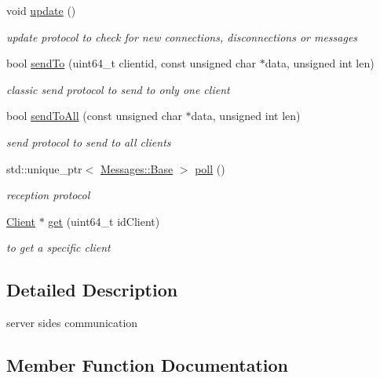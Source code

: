 \begin{DoxyCompactItemize}
void \hyperlink{class_network_1_1_t_c_p_1_1_server_a6a8fdc8571bbbd999c7c2767fc5b34bf}{update} ()
\begin{DoxyCompactList}\small\item\em update protocol to check for new connections, disconnections or messages \end{DoxyCompactList}\item 
bool \hyperlink{class_network_1_1_t_c_p_1_1_server_af7896a328c27db52fd99e0c5888754f1}{send\+To} (uint64\+\_\+t clientid, const unsigned char $\ast$data, unsigned int len)
\begin{DoxyCompactList}\small\item\em classic send protocol to send to only one client \end{DoxyCompactList}\item 
bool \hyperlink{class_network_1_1_t_c_p_1_1_server_af017b5f9caa9147cf4502750ccc3639a}{send\+To\+All} (const unsigned char $\ast$data, unsigned int len)
\begin{DoxyCompactList}\small\item\em send protocol to send to all clients \end{DoxyCompactList}\item 
std\+::unique\+\_\+ptr$<$ \hyperlink{class_network_1_1_messages_1_1_base}{Messages\+::\+Base} $>$ \hyperlink{class_network_1_1_t_c_p_1_1_server_ac4cc0dc0661e293f522a0bb7089bbfbe}{poll} ()
\begin{DoxyCompactList}\small\item\em reception protocol \end{DoxyCompactList}\item 
\hyperlink{class_network_1_1_t_c_p_1_1_client}{Client} $\ast$ \hyperlink{class_network_1_1_t_c_p_1_1_server_a3202b9aed7692f3cf6791c874459eceb}{get} (uint64\+\_\+t id\+Client)
\begin{DoxyCompactList}\small\item\em to get a specific client \end{DoxyCompactList}\end{DoxyCompactItemize}


\subsection{Detailed Description}
server side\textquotesingle{}s communication 

\subsection{Member Function Documentation}
\mbox{\label{class_network_1_1_t_c_p_1_1_server_a3202b9aed7692f3cf6791c874459eceb}} 
